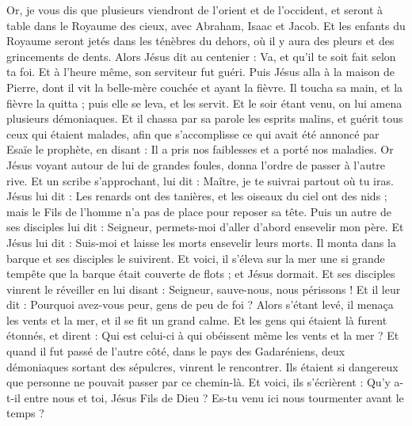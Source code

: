 \begin{multicols}{2}
Or, je vous dis que plusieurs viendront de l'orient et de l'occident, et seront à table dans le Royaume des cieux, avec Abraham, Isaac et Jacob.
Et les enfants du Royaume seront jetés dans les ténèbres du dehors, où il y aura des pleurs et des grincements de dents.
Alors Jésus dit au centenier : Va, et qu'il te soit fait selon ta foi. Et à l'heure même, son serviteur fut guéri.
Puis Jésus alla à la maison de Pierre, dont il vit la belle-mère couchée et ayant la fièvre.
Il toucha sa main, et la fièvre la quitta ; puis elle se leva, et les servit.
Et le soir étant venu, on lui amena plusieurs démoniaques. Et il chassa par sa parole les esprits malins, et guérit tous ceux qui étaient malades,
afin que s'accomplisse ce qui avait été annoncé par Esaïe le prophète, en disant : Il a pris nos faiblesses et a porté nos maladies.
Or Jésus voyant autour de lui de grandes foules, donna l'ordre de passer à l'autre rive.
Et un scribe s'approchant, lui dit : Maître, je te suivrai partout où tu iras.
Jésus lui dit : Les renards ont des tanières, et les oiseaux du ciel ont des nids ; mais le Fils de l'homme n'a pas de place pour reposer sa tête.
Puis un autre de ses disciples lui dit : Seigneur, permets-moi d'aller d'abord ensevelir mon père.
Et Jésus lui dit : Suis-moi et laisse les morts ensevelir leurs morts.
Il monta dans la barque et ses disciples le suivirent.
Et voici, il s'éleva sur la mer une si grande tempête que la barque était couverte de flots ; et Jésus dormait.
Et ses disciples vinrent le réveiller en lui disant : Seigneur, sauve-nous, nous périssons !
Et il leur dit : Pourquoi avez-vous peur, gens de peu de foi ? Alors s'étant levé, il menaça les vents et la mer, et il se fit un grand calme.
Et les gens qui étaient là furent étonnés, et dirent : Qui est celui-ci à qui obéissent même les vents et la mer ?
Et quand il fut passé de l'autre côté, dans le pays des Gadaréniens, deux démoniaques sortant des sépulcres, vinrent le rencontrer. Ils étaient si dangereux que personne ne pouvait passer par ce chemin-là.
Et voici, ils s'écrièrent : Qu'y a-t-il entre nous et toi, Jésus Fils de Dieu ? Es-tu venu ici nous tourmenter avant le temps ?

\end{multicols}

